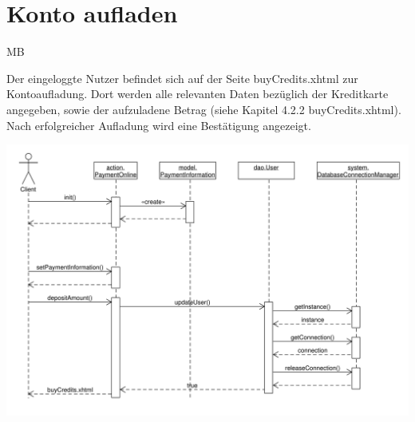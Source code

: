 \section{Konto aufladen}

\begin{tiny}
MB
\end{tiny}

Der eingeloggte Nutzer befindet sich auf der Seite buyCredits.xhtml zur Kontoaufladung. Dort werden alle relevanten Daten bezüglich der Kreditkarte angegeben, sowie der aufzuladene Betrag (siehe Kapitel 4.2.2 buyCredits.xhtml). Nach erfolgreicher Aufladung wird eine Bestätigung angezeigt.

\includegraphics[scale=0.45]{./Grafiken/Sequenzdiagramm-KontoAufladung.pdf}